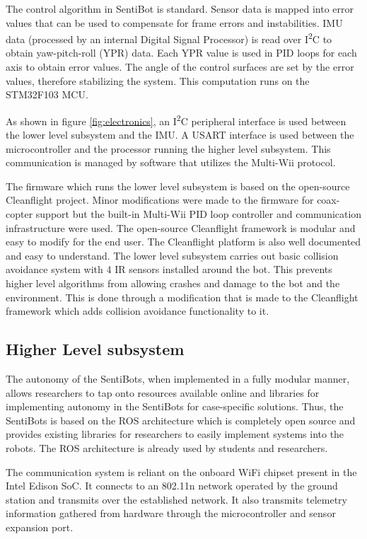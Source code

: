 \documentclass[12pt]{article}
\begin{document}
The control algorithm in SentiBot is standard. Sensor data is mapped into error values that can be used to compensate for frame errors and instabilities. IMU data (processed by an internal Digital Signal Processor) is read over I\textsuperscript{2}C to obtain yaw-pitch-roll (YPR) data. Each YPR value is used in PID loops for each axis to obtain error values. The angle of the control surfaces are set by the error values, therefore stabilizing the system. This computation runs on the STM32F103 MCU.

As shown in figure \ref{fig:electronics}, an I\textsuperscript{2}C peripheral interface is used between the lower level subsystem and the IMU. A USART interface is used between the microcontroller and the processor running the higher level subsystem. This communication is managed by software that utilizes the Multi-Wii protocol\cite{SFV}.

The firmware which runs the lower level subsystem is based on the open-source Cleanflight project. Minor modifications were made to the firmware for coax-copter support but the built-in Multi-Wii PID loop controller and communication infrastructure were used. The open-source Cleanflight framework is modular and easy to modify for the end user. The Cleanflight platform is also well documented and easy to understand. The lower level subsystem carries out basic collision avoidance system with 4 IR sensors installed around the bot. This prevents higher level algorithms from allowing crashes and damage to the bot and the environment. This is done through a modification that is made to the Cleanflight framework which adds collision avoidance functionality to it.

\subsection{Higher Level subsystem}

The autonomy of the SentiBots, when implemented in a fully modular manner, allows researchers to tap onto resources available online and libraries for implementing autonomy in the SentiBots for case-specific solutions. Thus, the SentiBots is based on the ROS architecture which is completely open source and provides existing libraries for researchers to easily implement systems into the robots. The ROS architecture is already used by students and researchers.

The communication system is reliant on the onboard WiFi chipset present in the Intel Edison SoC. It connects to an 802.11n network operated by the ground station and transmits over the established network. It also transmits telemetry information gathered from hardware through the microcontroller and sensor expansion port.
\end{document}
